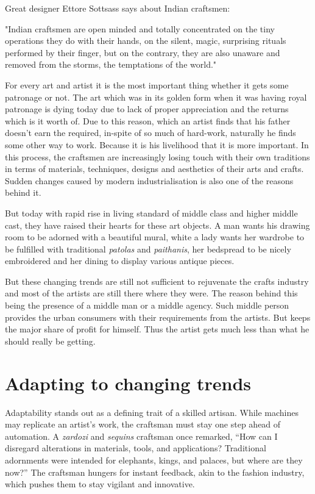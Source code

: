 Great designer Ettore Sottsass says about Indian craftsmen:

"Indian craftsmen are open minded and totally concentrated on the tiny operations they do with their hands, on the silent, magic, surprising rituals performed by their finger, but on the contrary, they are also unaware and removed from the storms, the temptations of the world."

For every art and artist it is the most important thing whether it gets some patronage or not. The art which was in its golden form when it was having royal patronage is dying today due to lack of proper appreciation and the returns which is it worth of. Due to this reason, which an artist finds that his father doesn't earn the required, in-spite of so much of hard-work, naturally he finds some other way to work. Because it is his livelihood that it is more important. In this process, the craftsmen are increasingly losing touch with their own traditions in terms of materials, techniques, designs and aesthetics of their arts and crafts. Sudden changes caused by modern industrialisation is also one of the reasons behind it.

But today with rapid rise in living standard of middle class and higher middle cast, they have raised their hearts for these art objects. A man wants his drawing room to be adorned with a beautiful mural, white a lady wants her wardrobe to be fulfilled with traditional \emph{patolas} and \emph{paithanis}, her bedspread to be nicely embroidered and her dining to display various antique pieces.

But these changing trends are still not sufficient to rejuvenate the crafts industry and most of the artists are still there where they were. The reason behind this being the presence of a middle man or a middle agency. Such middle person provides the urban consumers with their requirements from the artists. But keeps the major share of profit for himself. Thus the artist gets much less than what he should really be getting.


\section{Adapting to changing trends} %
\label{sec:act}

Adaptability stands out as a defining trait of a skilled artisan. While machines may replicate an artist's work, the craftsman must stay one step ahead of automation. A \emph{zardozi} and \emph{sequins} craftsman once remarked, ``How can I disregard alterations in materials, tools, and applications? Traditional adornments were intended for elephants, kings, and palaces, but where are they now?'' The craftsman hungers for instant feedback, akin to the fashion industry, which pushes them to stay vigilant and innovative.

